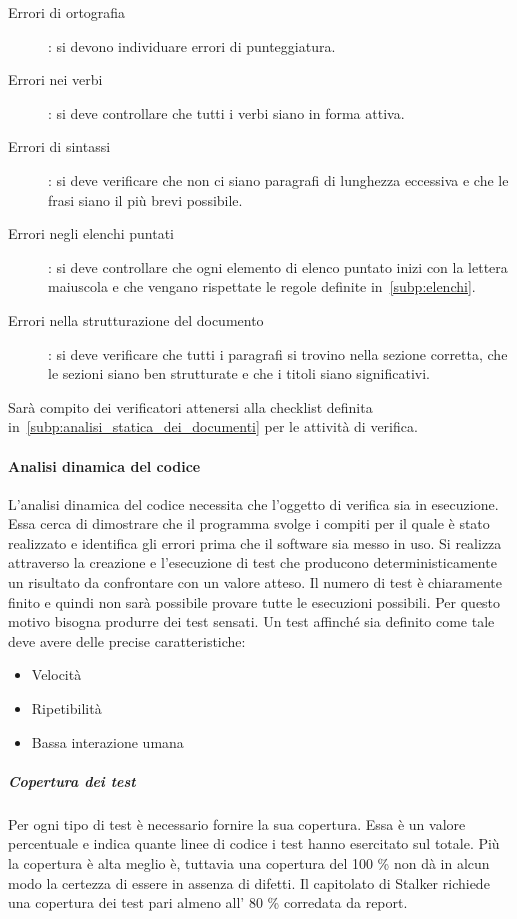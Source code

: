 \documentclass[../norme-di-progetto.tex]{subfiles}
\begin{document}
\begin{description}
  \item [Errori di ortografia]: si devono individuare errori di punteggiatura.
  \item [Errori nei verbi]: si deve controllare che tutti i verbi siano in forma attiva.
  \item [Errori di sintassi]: si deve verificare che non ci siano paragrafi di lunghezza eccessiva e che le frasi siano il più brevi possibile.
  \item [Errori negli elenchi puntati]: si deve controllare che ogni elemento di elenco puntato inizi con la lettera maiuscola e che vengano rispettate le regole definite in~\ref{subp:elenchi}.
  \item [Errori nella strutturazione del documento]: si deve verificare che tutti i paragrafi si trovino nella sezione corretta, che le sezioni siano ben strutturate e che i titoli siano significativi.
\end{description}

Sarà compito dei verificatori attenersi alla checklist definita in~\ref{subp:analisi_statica_dei_documenti} per le attività di verifica.

\paragraph{Analisi dinamica del codice}%
\label{par:analisi_dinamica_del_codice}
L'analisi dinamica del codice necessita che l'oggetto di verifica sia in esecuzione.
Essa cerca di dimostrare che il programma svolge i compiti per il quale è stato realizzato e identifica gli errori prima che il software sia messo in uso.
Si realizza attraverso la creazione e l'esecuzione di test che producono deterministicamente un risultato da confrontare con un valore atteso.
Il numero di test è chiaramente finito e quindi non sarà possibile provare tutte le esecuzioni possibili.
Per questo motivo bisogna produrre dei test sensati.
Un test affinché sia definito come tale deve avere delle precise caratteristiche:

\begin{itemize}
  \item Velocità
  \item Ripetibilità
  \item Bassa interazione umana
\end{itemize}

\subparagraph{Copertura dei test}%
\label{subp:copertura_dei_test}
Per ogni tipo di test è necessario fornire la sua copertura.
Essa è un valore percentuale e indica quante linee di codice i test hanno esercitato sul totale.
Più la copertura è alta meglio è, tuttavia una copertura del 100 \% non dà in alcun modo la certezza di essere in assenza di difetti.
Il capitolato di Stalker richiede una copertura dei test pari almeno all' 80 \% corredata da report.
\end{document}
